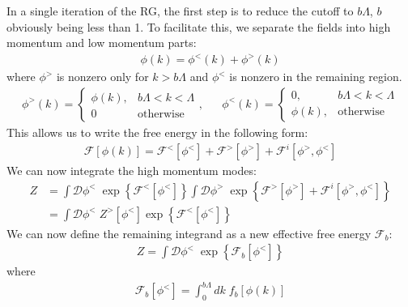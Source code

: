 \documentclass[14pt]{extarticle}
\begin{document}
In a single iteration of the RG, the first step is to reduce the cutoff to \(b\Lambda\), \(b\) obviously being less than 1. To facilitate this, we separate the fields into high momentum and low momentum parts:
\begin{equation}\begin{aligned}
\phi(k) = \phi^<(k) + \phi^>(k)
\end{aligned}\end{equation}
where \(\phi^>\) is nonzero only for \(k>b\Lambda\) and \(\phi^<\) is nonzero in the remaining region.
\begin{equation}\begin{aligned}
\phi^>(k) = \begin{cases} \phi(k), &b\Lambda < k <\Lambda\\ 0 &\text{otherwise} \end{cases},&&
\phi^<(k) = \begin{cases} 0, &b\Lambda < k <\Lambda\\ \phi(k), &\text{otherwise} \end{cases}
\end{aligned}\end{equation}
This allows us to write the free energy in the following form:
\begin{equation}\begin{aligned}
\mathcal{F}[\phi(k)] = \mathcal{F}^<[\phi^<] + \mathcal{F}^>[\phi^>] + \mathcal{F}^i[\phi^>,\phi^<]
\end{aligned}\end{equation}
We can now integrate the high momentum modes:
\begin{equation}\begin{aligned}
	Z &= \int \mathcal{D}\phi^<\; \exp\left\{\mathcal{F}^<[\phi^<]\right\}\int \mathcal{D}\phi^>\;\exp\left\{\mathcal{F}^>[\phi^>] + \mathcal{F}^i[\phi^>,\phi^<]\right\}\\
	  &=\int \mathcal{D}\phi^<\; Z^>[\phi^<]\exp\left\{\mathcal{F}^<[\phi^<]\right\}
\end{aligned}\end{equation}
We can now define the remaining integrand as a new effective free energy \(\mathcal{F}_b\):
\begin{equation}\begin{aligned}
	Z  =\int \mathcal{D}\phi^<\; \exp\left\{\mathcal{F}_b[\phi^<]\right\}
\end{aligned}\end{equation}
where
\begin{equation}\begin{aligned}
\mathcal{F}_b[\phi^<] = \int_0^{b\Lambda} dk\;{f_b}[\phi(k)]
\end{aligned}\end{equation}
\end{document}
